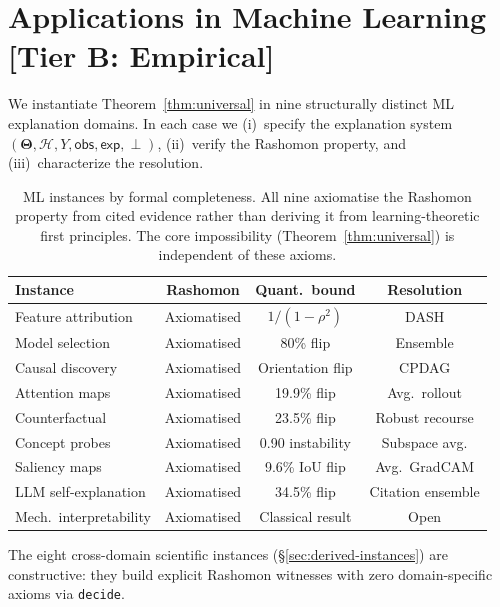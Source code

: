 \documentclass[11pt,a4paper]{article}
\newcommand{\Params}{\mathbf{\Theta}}
\newcommand{\sH}{\mathcal{H}}
\newcommand{\incomp}{\perp}
\begin{document}
\section{Applications in Machine Learning\,\textnormal{\normalsize[Tier B: Empirical]}}
\label{sec:ml-instances}

We instantiate Theorem~\ref{thm:universal} in nine structurally distinct
ML explanation domains.  In each case we (i)~specify the explanation system
$(\Params, \sH, Y, \mathsf{obs}, \mathsf{exp}, \incomp)$, (ii)~verify the
Rashomon property, and (iii)~characterize the resolution.

\begin{table}[h]
\centering
\small
\caption{ML instances by formal completeness. All nine axiomatise the Rashomon property from cited evidence rather than deriving it from learning-theoretic first principles. The core impossibility (Theorem~\ref{thm:universal}) is independent of these axioms.}
\label{tab:ml-tiers}
\begin{tabular}{lccc}
\toprule
Instance & Rashomon & Quant.\ bound & Resolution \\
\midrule
Feature attribution & Axiomatised & $1/(1{-}\rho^2)$ & DASH \\
Model selection & Axiomatised & 80\% flip & Ensemble \\
Causal discovery & Axiomatised & Orientation flip & CPDAG \\
Attention maps & Axiomatised & 19.9\% flip & Avg.\ rollout \\
Counterfactual & Axiomatised & 23.5\% flip & Robust recourse \\
Concept probes & Axiomatised & 0.90 instability & Subspace avg. \\
Saliency maps & Axiomatised & 9.6\% IoU flip & Avg.\ GradCAM \\
LLM self-explanation & Axiomatised & 34.5\% flip & Citation ensemble \\
Mech.\ interpretability & Axiomatised & Classical result & Open \\
\bottomrule
\end{tabular}
\end{table}

The eight cross-domain scientific instances (\S\ref{sec:derived-instances}) are constructive: they build explicit Rashomon witnesses with zero domain-specific axioms via \texttt{decide}.
\end{document}
